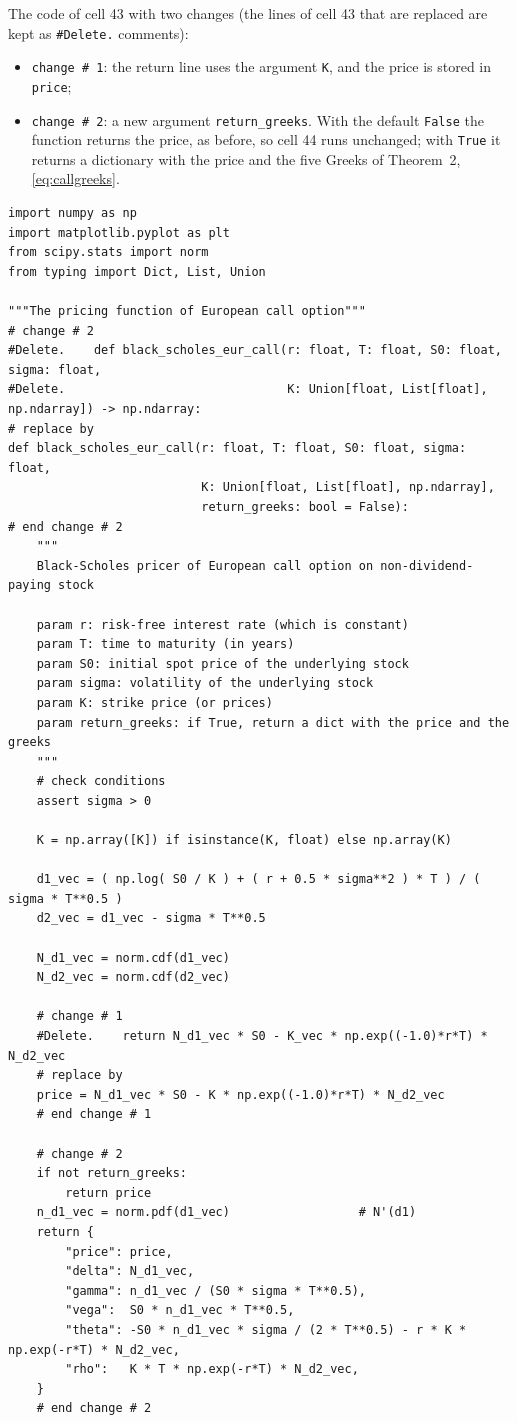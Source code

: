 \documentclass[11pt,a4paper]{article}
\newcommand{\subhead}[1]{\par\medskip\noindent{\large\bfseries #1}\par\smallskip\noindent\ignorespaces}
\begin{document}
\subhead{New version.} The code of cell 43 with two changes (the lines of cell 43 that are replaced are kept as \texttt{\#Delete.} comments):
\begin{itemize}
\item \texttt{change \# 1}: the return line uses the argument \texttt{K}, and the price is stored in \texttt{price};
\item \texttt{change \# 2}: a new argument \texttt{return\_greeks}. With the default \texttt{False} the function returns the price, as before, so cell 44 runs unchanged; with \texttt{True} it returns a dictionary with the price and the five Greeks of Theorem~2, \eqref{eq:callgreeks}.
\end{itemize}
\par\smallskip\noindent\begin{minipage}{\linewidth}\begin{lstlisting}[style=prof,title={new version of cell 43}]
import numpy as np
import matplotlib.pyplot as plt
from scipy.stats import norm
from typing import Dict, List, Union

"""The pricing function of European call option"""
# change # 2
#Delete.    def black_scholes_eur_call(r: float, T: float, S0: float, sigma: float,
#Delete.                               K: Union[float, List[float], np.ndarray]) -> np.ndarray:
# replace by
def black_scholes_eur_call(r: float, T: float, S0: float, sigma: float,
                           K: Union[float, List[float], np.ndarray],
                           return_greeks: bool = False):
# end change # 2
    """
    Black-Scholes pricer of European call option on non-dividend-paying stock

    param r: risk-free interest rate (which is constant)
    param T: time to maturity (in years)
    param S0: initial spot price of the underlying stock
    param sigma: volatility of the underlying stock
    param K: strike price (or prices)
    param return_greeks: if True, return a dict with the price and the greeks
    """
    # check conditions
    assert sigma > 0

    K = np.array([K]) if isinstance(K, float) else np.array(K)

    d1_vec = ( np.log( S0 / K ) + ( r + 0.5 * sigma**2 ) * T ) / ( sigma * T**0.5 )
    d2_vec = d1_vec - sigma * T**0.5

    N_d1_vec = norm.cdf(d1_vec)
    N_d2_vec = norm.cdf(d2_vec)

    # change # 1
    #Delete.    return N_d1_vec * S0 - K_vec * np.exp((-1.0)*r*T) * N_d2_vec
    # replace by
    price = N_d1_vec * S0 - K * np.exp((-1.0)*r*T) * N_d2_vec
    # end change # 1

    # change # 2
    if not return_greeks:
        return price
    n_d1_vec = norm.pdf(d1_vec)                  # N'(d1)
    return {
        "price": price,
        "delta": N_d1_vec,
        "gamma": n_d1_vec / (S0 * sigma * T**0.5),
        "vega":  S0 * n_d1_vec * T**0.5,
        "theta": -S0 * n_d1_vec * sigma / (2 * T**0.5) - r * K * np.exp(-r*T) * N_d2_vec,
        "rho":   K * T * np.exp(-r*T) * N_d2_vec,
    }
    # end change # 2
\end{lstlisting}\end{minipage}\par\smallskip
\end{document}
